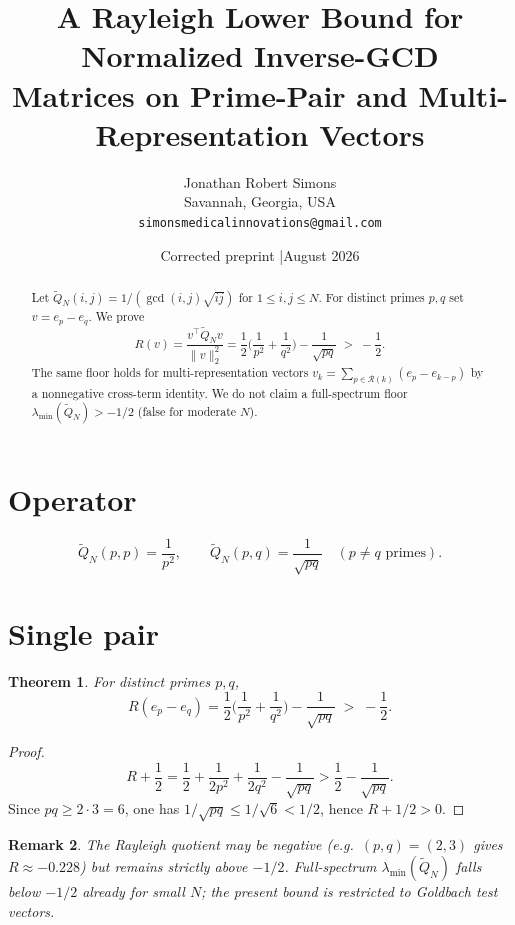 \documentclass[11pt]{article}
\title{\textbf{A Rayleigh Lower Bound for Normalized Inverse-GCD\\
Matrices on Prime-Pair and Multi-Representation Vectors}}
\author{Jonathan Robert Simons\\
Savannah, Georgia, USA\\
\texttt{simonsmedicalinnovations@gmail.com}}
\date{Corrected preprint \quad|\quad August 2026}
\newtheorem{theorem}{Theorem}[section]
\newtheorem{remark}[theorem]{Remark}
\begin{document}
\maketitle

\begin{center}
\end{center}
\vspace{0.75em}

\begin{abstract}
Let $\widetilde Q_N(i,j)=1/(\gcd(i,j)\sqrt{ij})$ for $1\le i,j\le N$.
For distinct primes $p,q$ set $v=e_p-e_q$. We prove
\[
R(v)=\frac{v^\top\widetilde Q_N v}{\|v\|_2^2}
=\frac12\Big(\frac1{p^2}+\frac1{q^2}\Big)-\frac1{\sqrt{pq}}
\;>\;-\frac12.
\]
The same floor holds for multi-representation vectors
$v_k=\sum_{p\in\mathcal{R}(k)}(e_p-e_{k-p})$ by a nonnegative cross-term
identity. We do not claim a full-spectrum floor
$\lambda_{\min}(\widetilde Q_N)>-1/2$ (false for moderate $N$).
\end{abstract}

\section{Operator}

\[
\widetilde Q_N(p,p)=\frac1{p^2},\qquad
\widetilde Q_N(p,q)=\frac1{\sqrt{pq}}\quad(p\neq q\text{ primes}).
\]

\section{Single pair}

\begin{theorem}
For distinct primes $p,q$,
\[
R(e_p-e_q)=\frac12\Big(\frac1{p^2}+\frac1{q^2}\Big)-\frac1{\sqrt{pq}}\;>\;-\frac12.
\]
\end{theorem}

\begin{proof}
\[
R+\frac12
=\frac12+\frac1{2p^2}+\frac1{2q^2}-\frac1{\sqrt{pq}}
>\frac12-\frac1{\sqrt{pq}}.
\]
Since $pq\ge 2\cdot 3=6$, one has $1/\sqrt{pq}\le 1/\sqrt6<1/2$, hence $R+1/2>0$.
\end{proof}

\begin{remark}
The Rayleigh quotient may be negative (e.g.\ $(p,q)=(2,3)$ gives $R\approx -0.228$)
but remains strictly above $-1/2$. Full-spectrum $\lambda_{\min}(\widetilde Q_N)$
falls below $-1/2$ already for small $N$; the present bound is restricted to
Goldbach test vectors.
\end{remark}
\end{document}
